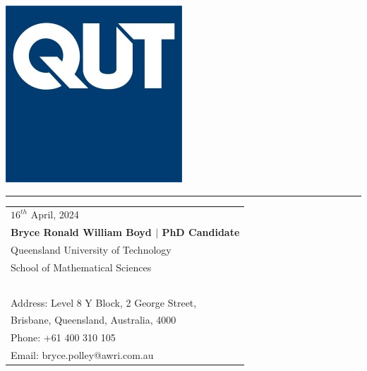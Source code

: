 \documentclass{article}
\begin{document}

\includegraphics[scale=0.5]{logo.jpg} %

\vspace{-1em} %

\rule{\linewidth}{1pt} %

\bigskip\bigskip %


\hfill
\begin{tabular}{l @{}}
	$16^{th}$ April, 2024\\ %
	\textbf{Bryce Ronald William Boyd $|$ PhD Candidate}\\
	Queensland University of Technology \\
	School of Mathematical Sciences\\~\\
	Address: Level 8 Y Block, 2 George Street, \\
	Brisbane, Queensland, Australia, 4000\\
	Phone: +61 400 310 105 \\
	Email: bryce.polley@awri.com.au
\end{tabular}

\bigskip %

\end{document}
